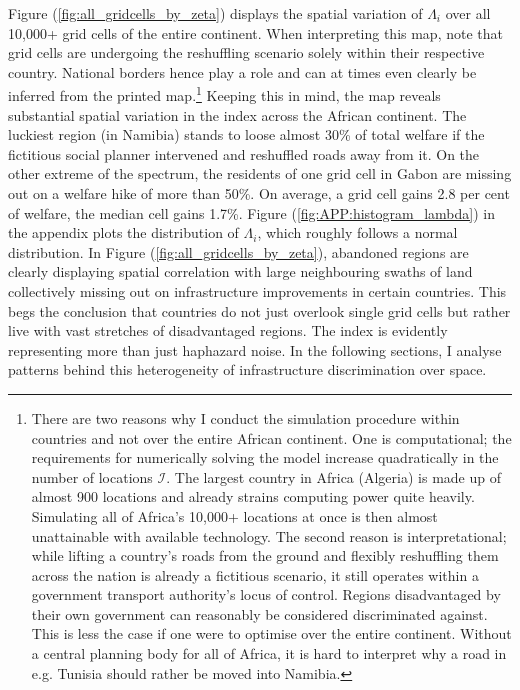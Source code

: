 \documentclass[11pt, oneside]{article}   	%
\let\oldref\ref
\renewcommand{\ref}[1]{(\oldref{#1})}
\begin{document}
Figure \ref{fig:all_gridcells_by_zeta} displays the spatial variation of $\Lambda_{i}$ over all 10,000+ grid cells of the entire continent. When interpreting this map, note that grid cells are undergoing the reshuffling scenario solely within their respective country. National borders hence play a role and can at times even clearly be inferred from the printed map.\footnote{There are two reasons why I conduct the simulation procedure within countries and not over the entire African continent. One is computational; the requirements for numerically solving the model increase quadratically in the number of locations $\mathcal{I}$. The largest country in Africa (Algeria) is made up of almost 900 locations and already strains computing power quite heavily. Simulating all of Africa's 10,000+ locations at once is then almost unattainable with available technology. The second reason is interpretational; while lifting a country's roads from the ground and flexibly reshuffling them across the nation is already a fictitious scenario, it still operates within a government transport authority's locus of control. Regions disadvantaged by their own government can reasonably be considered discriminated against. This is less the case if one were to optimise over the entire continent. Without a central planning body for all of Africa, it is hard to interpret why a road in e.g. Tunisia should rather be moved into Namibia.}  Keeping this in mind, the map reveals substantial spatial variation in the index across the African continent. The luckiest region (in Namibia) stands to loose almost 30\% of total welfare if the fictitious social planner intervened and reshuffled roads away from it. On the other extreme of the spectrum, the residents of one grid cell in Gabon are missing out on a welfare hike of more than 50\%. On average, a grid cell gains 2.8 per cent of welfare, the median cell gains 1.7\%. Figure \ref{fig:APP:histogram_lambda} in the appendix plots the distribution of $\Lambda_{i}$, which roughly follows a normal distribution. In Figure \ref{fig:all_gridcells_by_zeta}, abandoned regions are clearly displaying spatial correlation with large neighbouring swaths of land collectively missing out on infrastructure improvements in certain countries. This begs the conclusion that countries do not just overlook single grid cells but rather live with vast stretches of disadvantaged regions. The index is evidently representing more than just haphazard noise. In the following sections, I analyse patterns behind this heterogeneity of infrastructure discrimination over space.
\end{document}

